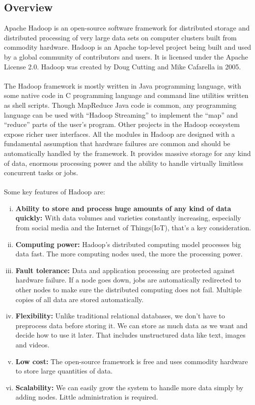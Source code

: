 \documentclass[a4paper,12pt,oneside]{report}
\begin{document}
\subsection{Overview}
Apache Hadoop is an open-source software framework for distributed storage
and distributed processing of very large data sets on computer clusters built from commodity
hardware.\cite{Apache} Hadoop is an Apache top-level project being built and used by a global
community of contributors and users. It is licensed under the Apache License 2.0.\cite{Introapache} 
Hadoop was created by Doug Cutting and Mike Cafarella in 2005.\\
\\
The Hadoop framework is mostly written in Java programming language,
with some native code in C programming language and command line utilities
written as shell scripts. Though MapReduce Java code is common, any programming language can
be used with “Hadoop Streaming” to implement the “map” and “reduce” parts of the user’s program.\cite{Hadoopadventures}
Other projects in the Hadoop ecosystem expose richer user interfaces.
All the modules in Hadoop are designed with a fundamental assumption that
hardware failures are common and should be automatically handled by the framework.
It provides massive storage for any kind of data, enormous processing power and the ability to handle virtually
limitless concurrent tasks or jobs.\\
\\
Some key features of Hadoop are:
\begin{enumerate}[(i)]
        \item \textbf{Ability to store and process huge amounts of any kind of data quickly:}
                With data volumes and varieties constantly increasing, especially from social media and the Internet of Things(IoT), that’s a key consideration.
        \item \textbf{Computing power:} Hadoop’s distributed computing model processes big data fast. The more computing nodes used, the more the processing power.
        \item \textbf{Fault tolerance:} Data and application processing are protected against hardware failure. If a node goes down, jobs are automatically redirected to other nodes to make sure the distributed computing does not fail. Multiple copies of all data are stored automatically.
        \item \textbf{Flexibility:} Unlike traditional relational databases, we don’t have to preprocess data before storing it. We can store as much data as we want and decide how to use it later. That includes unstructured data like text, images and videos.
        \item \textbf{Low cost:} The open-source framework is free and uses commodity hardware to store large quantities of data.
        \item \textbf{Scalability:} We can easily grow the system to handle more data simply by adding nodes. Little administration is required.
\end{enumerate}
\end{document}
